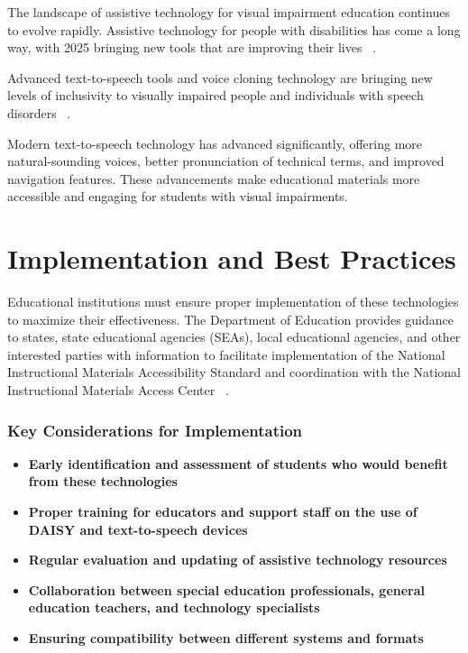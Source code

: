 The landscape of assistive technology for visual impairment education continues to evolve rapidly. Assistive technology for people with disabilities has come a long way, with 2025 bringing new tools that are improving their lives~ \cite{Speechify2025}.

Advanced text-to-speech tools and voice cloning technology are bringing new levels of inclusivity to visually impaired people and individuals with speech disorders~ \cite{Respeecher2024}.

Modern text-to-speech technology has advanced significantly, offering more natural-sounding voices, better pronunciation of technical terms, and improved navigation features. These advancements make educational materials more accessible and engaging for students with visual impairments.

\section{Implementation and Best Practices}\label{implementation}

Educational institutions must ensure proper implementation of these technologies to maximize their effectiveness. The Department of Education provides guidance to states, state educational agencies (SEAs), local educational agencies, and other interested parties with information to facilitate implementation of the National Instructional Materials Accessibility Standard and coordination with the National Instructional Materials Access Center~ \cite{USDeptEducation2021}.

\subsubsection{Key Considerations for Implementation}

\begin{itemize}

    \item \textbf{Early identification and assessment of students who would benefit from these technologies}
    \item \textbf{Proper training for educators and support staff on the use of DAISY and text-to-speech devices}
    \item \textbf{Regular evaluation and updating of assistive technology resources}
    \item \textbf{Collaboration between special education professionals, general education teachers, and technology specialists}
    \item \textbf{Ensuring compatibility between different systems and formats}

\end{itemize}

